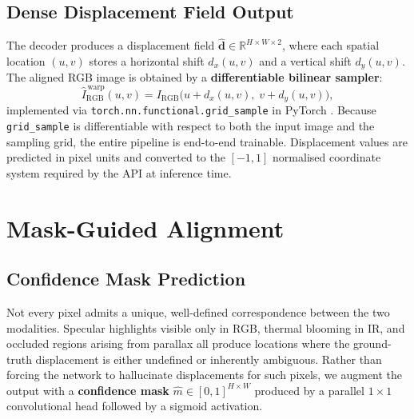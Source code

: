 \subsection{Dense Displacement Field Output}
\label{subsec:displacement_field}

The decoder produces a displacement field $\hat{\mathbf{d}} \in
\mathbb{R}^{H \times W \times 2}$, where each spatial location
$(u,v)$ stores a horizontal shift $d_x(u,v)$ and a vertical shift
$d_y(u,v)$.  The aligned RGB image is obtained by a
\textbf{differentiable bilinear sampler}:
\begin{equation}
  \hat{I}_{\mathrm{RGB}}^{\,\text{warp}}(u,v)
    = I_{\mathrm{RGB}}\!\bigl(u + d_x(u,v),\; v + d_y(u,v)\bigr),
  \label{eq:warp}
\end{equation}
implemented via \texttt{torch.nn.functional.grid\_sample} in PyTorch
\cite{jaderberg2015spatial}.  Because \texttt{grid\_sample} is
differentiable with respect to both the input image and the sampling grid,
the entire pipeline is end-to-end trainable.  Displacement values are
predicted in pixel units and converted to the $[-1,1]$ normalised
coordinate system required by the API at inference time.

\section{Mask-Guided Alignment}
\label{sec:mask_guided}

\subsection{Confidence Mask Prediction}
\label{subsec:confidence_mask}

Not every pixel admits a unique, well-defined correspondence between the
two modalities.  Specular highlights visible only in RGB, thermal blooming
in IR, and occluded regions arising from parallax all produce locations
where the ground-truth displacement is either undefined or inherently
ambiguous.  Rather than forcing the network to hallucinate displacements
for such pixels, we augment the output with a \textbf{confidence mask}
$\hat{m} \in [0,1]^{H \times W}$ produced by a parallel $1 \times 1$
convolutional head followed by a sigmoid activation.

